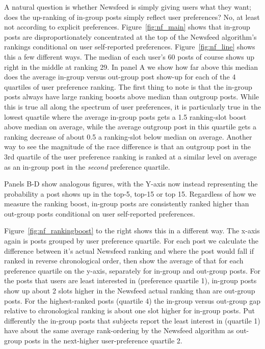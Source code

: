 \documentclass[12pt,letterpaper]{article}
\begin{document}
A natural question is whether Newsfeed is simply giving users what they want; does the up-ranking of in-group posts simply reflect user preferences? No, at least not according to explicit preferences. Figure~\ref{fig:nf_main} shows that in-group posts are disproportionately concentrated at the top of the Newsfeed algorithm's rankings conditional on user self-reported preferences. Figure~\ref{fig:nf_line} shows this a few different ways. The median of each user's 60 posts of course shows up right in the middle at ranking 29. In panel A we show how far above this median does the average in-group versus out-group post show-up for each of the 4 quartiles of user preference ranking. The first thing to note is that the in-group posts always have large ranking boosts above median than outgroup posts. While this is true all along the spectrum of user preferences, it is particularly true in the lowest quartile where the average in-group posts gets a 1.5  ranking-slot boost above median on average, while the average outgroup post in this quartile gets a ranking decrease of about 0.5 a ranking-slot below median on average. Another way to see the magnitude of the race difference is that an outgroup post in the 3rd quartile of the user preference ranking is ranked at a similar level on average as an in-group post in the \textit{second} preference quartile. 

Panels B-D show analogous figures, with the Y-axis now instead representing the probability a post shows up in the top-5, top-15 or top 15. Regardless of how we measure the ranking boost, in-group posts are consistently ranked higher than out-group posts conditional on user self-reported preferences.

Figure~\ref{fig:nf_rankingboost} to the right shows this in a different way. The x-axis again is posts grouped by user preference quartile. For each post we calculate the difference between it's actual Newsfeed ranking and where the post would fall if ranked in reverse chronological order, then show the average of that for each preference quartile on the y-axis, separately for in-group and out-group posts. For the posts that users are least interested in (preference quartile 1), in-group posts show up about 2 slots higher in the Newsfeed actual ranking than are out-group posts. For the highest-ranked posts (quartile 4) the in-group versus out-group gap relative to chronological ranking is about one slot higher for in-group posts. Put differently the in-group posts that subjects report the least interest in (quartile 1) have about the same average rank-ordering by the Newsfeed algorithm as out-group posts in the next-higher user-preference quartile 2.
\end{document}
